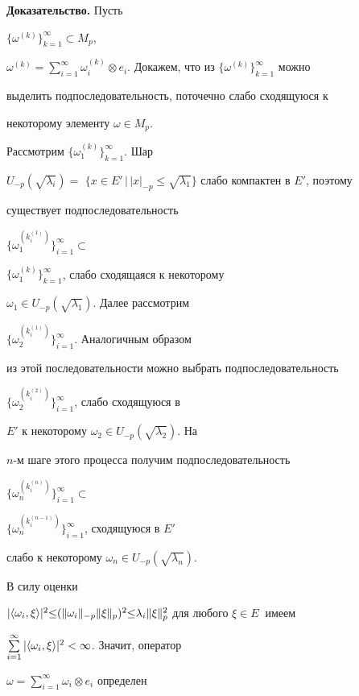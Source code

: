 {\bf Доказательство.} Пусть


$\{\omega^{(k)}\}_{k=1}^{\infty}\subset M_p$,


$\omega^{(k)}=\sum\limits_{i=1}^{\infty}\omega_i^{(k)}\otimes


e_i$. Докажем, что из $\{\omega^{(k)}\}_{k=1}^{\infty}$ можно


выделить подпоследовательность, поточечно слабо сходящуюся к


некоторому элементу $\omega\in M_p$.





Рассмотрим $\{\omega^{(k)}_1\}_{k=1}^{\infty}$. Шар


$U_{-p}(\sqrt{\lambda_i})=$ $\{x\in E'\, \big|\,


|x|_{-p}\leq\sqrt{\lambda_1}\}$ слабо компактен в $E'$, поэтому


существует подпоследовательность


$\{\omega^{(k_i^{(1)})}_1\}_{i=1}^{\infty}\subset$


$\{\omega^{(k)}_1\}_{k=1}^{\infty}$, слабо сходящаяся к некоторому


$\omega_1\in U_{-p}(\sqrt{\lambda_1})$. Далее рассмотрим


$\{\omega^{(k_i^{(1)})}_2\}_{i=1}^{\infty}$. Аналогичным образом


из этой последовательности можно выбрать подпоследовательность


$\{\omega^{(k_i^{(2)})}_2\}_{i=1}^{\infty}$, слабо сходящуюся в


$E'$ к некоторому $\omega_2\in U_{-p}(\sqrt{\lambda_2})$. На


$n$-м шаге этого процесса получим подпоследовательность


$\{\omega^{(k_i^{(n)})}_n\}_{i=1}^{\infty}\subset$


$\{\omega^{(k_i^{(n-1)})}_n\}_{i=1}^{\infty}$, сходящуюся в $E'$


слабо к некоторому $\omega_n\in U_{-p}(\sqrt{\lambda_n})$.





В силу оценки


$|\la \omega_i,\xi\ra |^2{\le} (\|\omega_i\|_{-p}\|\xi\|_{p})^2{\le}


\lambda_i\|\xi\|_p^2$ для любого $\xi\in E\ $ имеем


$\sum\limits_{i=1}^{\infty}|\langle \omega_i,\xi\rangle |^2<\infty$. Значит, оператор


$\omega=\sum\limits_{i=1}^{\infty}\omega_i\otimes e_i$ определен


